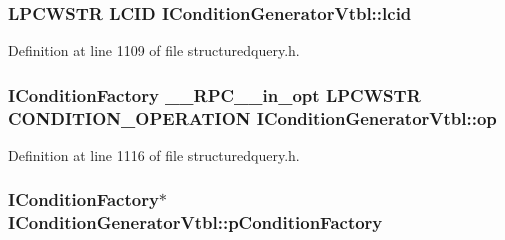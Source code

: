 \subsubsection[{\texorpdfstring{lcid}{lcid}}]{ {\bf L\+P\+C\+W\+S\+TR} {\bf L\+C\+ID} I\+Condition\+Generator\+Vtbl\+::lcid}\hypertarget{struct_i_condition_generator_vtbl_af56fb8d8aa34641e6e49499c8f636e8f}{}\label{struct_i_condition_generator_vtbl_af56fb8d8aa34641e6e49499c8f636e8f}


Definition at line 1109 of file structuredquery.\+h.

\subsubsection[{\texorpdfstring{op}{op}}]{ {\bf I\+Condition\+Factory} {\bf \+\_\+\+\_\+\+R\+P\+C\+\_\+\+\_\+in\+\_\+opt} {\bf L\+P\+C\+W\+S\+TR} {\bf C\+O\+N\+D\+I\+T\+I\+O\+N\+\_\+\+O\+P\+E\+R\+A\+T\+I\+ON} I\+Condition\+Generator\+Vtbl\+::op}\hypertarget{struct_i_condition_generator_vtbl_a7eb3bf94d87ba663e90b261a32cebbb8}{}\label{struct_i_condition_generator_vtbl_a7eb3bf94d87ba663e90b261a32cebbb8}


Definition at line 1116 of file structuredquery.\+h.

\subsubsection[{\texorpdfstring{p\+Condition\+Factory}{pConditionFactory}}]{ {\bf I\+Condition\+Factory}$\ast$ I\+Condition\+Generator\+Vtbl\+::p\+Condition\+Factory}\hypertarget{struct_i_condition_generator_vtbl_a60c88634d30319aa310538fdb6baee4c}{}\label{struct_i_condition_generator_vtbl_a60c88634d30319aa310538fdb6baee4c}


